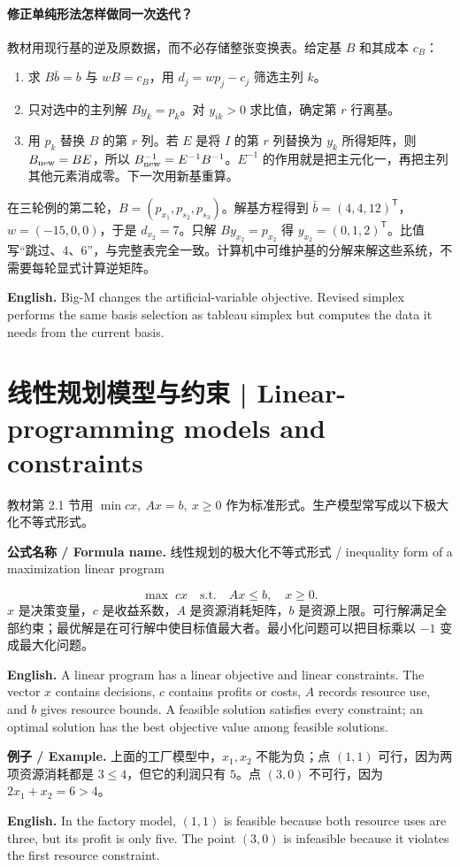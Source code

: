 \documentclass[UTF8,11pt,a4paper]{ctexart}
\newcommand{\EN}[1]{\par\noindent \textbf{English.} #1\par}
\newcommand{\FORMULA}[2]{\par\noindent\textbf{公式名称 / Formula name.} #1 / #2\par}
\newcommand{\EX}[2]{\par\noindent \textbf{例子 / Example.} #1\par\EN{#2}}
\begin{document}
\paragraph{修正单纯形法怎样做同一次迭代？}
教材用现行基的逆及原数据，而不必存储整张变换表。给定基 $B$ 和其成本 $c_B$：
\begin{enumerate}
\item 求 $B\bar b=b$ 与 $wB=c_B$，用 $d_j=wp_j-c_j$ 筛选主列 $k$。
\item 只对选中的主列解 $By_k=p_k$。对 $y_{ik}>0$ 求比值，确定第 $r$ 行离基。
\item 用 $p_k$ 替换 $B$ 的第 $r$ 列。若 $E$ 是将 $I$ 的第 $r$ 列替换为 $y_k$ 所得矩阵，则 $B_{\rm new}=BE$，所以 $B_{\rm new}^{-1}=E^{-1}B^{-1}$。$E^{-1}$ 的作用就是把主元化一，再把主列其他元素消成零。下一次用新基重算。
\end{enumerate}
在三轮例的第二轮，$B=(p_{x_1},p_{s_2},p_{s_3})$。解基方程得到 $\bar b=(4,4,12)^{\mathsf T}$，$w=(-15,0,0)$，于是 $d_{x_2}=7$。只解 $By_{x_2}=p_{x_2}$ 得 $y_{x_2}=(0,1,2)^{\mathsf T}$。比值写“跳过、4、6”，与完整表完全一致。计算机中可维护基的分解来解这些系统，不需要每轮显式计算逆矩阵。
\EN{Big-M changes the artificial-variable objective. Revised simplex performs the same basis selection as tableau simplex but computes the data it needs from the current basis.}
\clearpage

\section{线性规划模型与约束 | Linear-programming models and constraints}
\noindent 教材第 2.1 节用 $\min cx,\ Ax=b,\ x\ge0$ 作为标准形式。生产模型常写成以下极大化不等式形式。
\FORMULA{线性规划的极大化不等式形式}{inequality form of a maximization linear program}
\[
\max\;cx\quad\text{s.t.}\quad Ax\le b,\quad x\ge0.
\]
$x$ 是决策变量，$c$ 是收益系数，$A$ 是资源消耗矩阵，$b$ 是资源上限。可行解满足全部约束；最优解是在可行解中使目标值最大者。最小化问题可以把目标乘以 $-1$ 变成最大化问题。
\EN{A linear program has a linear objective and linear constraints. The vector $x$ contains decisions, $c$ contains profits or costs, $A$ records resource use, and $b$ gives resource bounds. A feasible solution satisfies every constraint; an optimal solution has the best objective value among feasible solutions.}
\EX{上面的工厂模型中，$x_1,x_2$ 不能为负；点 $(1,1)$ 可行，因为两项资源消耗都是 $3\le4$，但它的利润只有 $5$。点 $(3,0)$ 不可行，因为 $2x_1+x_2=6>4$。}{In the factory model, $(1,1)$ is feasible because both resource uses are three, but its profit is only five. The point $(3,0)$ is infeasible because it violates the first resource constraint.}
\end{document}
